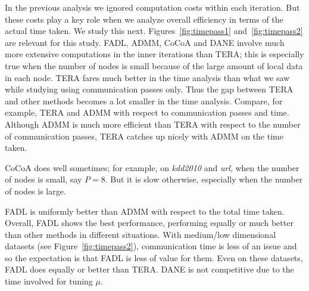 \documentclass[twoside, 11pt]{article}
\begin{document}
In the previous analysis we ignored computation costs within each iteration. But these costs play a key role when we analyze overall efficiency in terms of the actual time taken. We study this next. Figures~\ref{fig:timepass1} and~\ref{fig:timepass2} are relevant for this study. FADL, ADMM, CoCoA and DANE involve much more extensive computations in the inner iterations than TERA; this is especially true when the number of nodes is small because of the large amount of local data in each node. TERA fares much better in the time analysis than what we saw while studying using communication passes only. Thus the gap between TERA and other methods becomes a lot smaller in the time analysis. Compare, for example, TERA and ADMM with respect to communication passes and time. Although ADMM is much more efficient than TERA with respect to the number of communication passes, TERA catches up nicely with ADMM on the time taken.

CoCoA does well sometimes; for example, on {\it kdd2010} and {\it url}, when the number of nodes is small, say $P=8$. But it is slow otherwise, especially when the number of nodes is large.

FADL is uniformly better than ADMM with respect to the total time taken.
Overall, FADL shows the best performance, performing equally or much better than other methods in different situations. With medium/low dimensional datasets (see Figure~\ref{fig:timepass2}), communication time is less of an issue and so the expectation is that FADL is less of value for them. Even on these datasets, FADL does equally or better than TERA. DANE is not competitive due to the time involved for tuning $\mu$.
\end{document}
